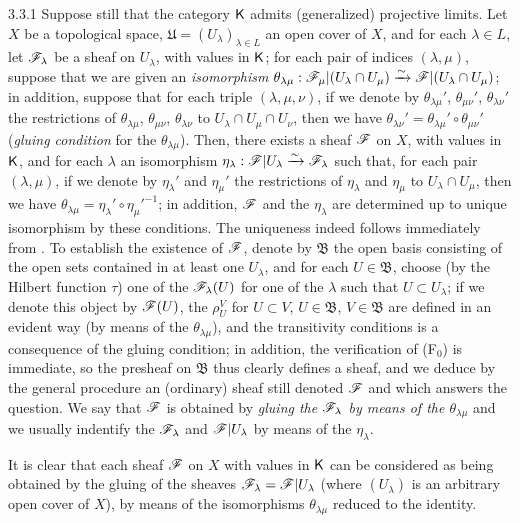 \begin{env}{3.3.1}
\label{env-0.3.3.1}
Suppose still that the category $\mathsf{K}$ admits (generalized) projective limits. Let $X$ be
a topological space, $\mathfrak{U}=(U_\lambda)_{\lambda\in L}$ an open cover of $X$, and for
each $\lambda\in L$, let $\mathscr{F}_\lambda$ be a sheaf on $U_\lambda$, with values in $\mathsf{K}$; for
each pair of indices $(\lambda,\mu)$, suppose that we are given an \emph{isomorphism}
$\theta_{\lambda\mu}:\mathscr{F}_\mu|(U_\lambda\cap U_\mu)\xrightarrow{\sim}\mathscr{F}|(U_\lambda\cap U_\mu)$; in
addition, suppose that for each triple $(\lambda,\mu,\nu)$, if we denote by
$\theta_{\lambda\mu}'$, $\theta_{\mu\nu}'$, $\theta_{\lambda\nu}'$ the restrictions of
$\theta_{\lambda\mu}$, $\theta_{\mu\nu}$, $\theta_{\lambda\nu}$ to
$U_\lambda\cap U_\mu\cap U_\nu$, then we have
$\theta_{\lambda\nu}'=\theta_{\lambda\mu}'\circ\theta_{\mu\nu}'$ (\emph{gluing condition} for
the $\theta_{\lambda\mu}$). Then, there exists a sheaf $\mathscr{F}$ on $X$, with values in $\mathsf{K}$,
and for each $\lambda$ an isomorphism
$\eta_\lambda:\mathscr{F}|U_\lambda\xrightarrow{\sim}\mathscr{F}_\lambda$ such that, for each pair
$(\lambda,\mu)$, if we denote by $\eta_\lambda'$ and $\eta_\mu'$ the restrictions of
$\eta_\lambda$ and $\eta_\mu$ to $U_\lambda\cap U_\mu$, then we have
$\theta_{\lambda\mu}=\eta_\lambda'\circ{\eta_\mu'}^{-1}$; in addition, $\mathscr{F}$ and the
$\eta_\lambda$ are determined up to unique isomorphism by these conditions. The uniqueness
indeed follows immediately from . To establish the existence of $\mathscr{F}$,
denote by $\mathfrak{B}$ the open basis consisting of the open sets contained in at least one
$U_\lambda$, and for each $U\in\mathfrak{B}$, choose (by the Hilbert function $\tau$) one of
the $\mathscr{F}_\lambda(U)$ for one of the $\lambda$ such that $U\subset U_\lambda$; if we denote
this object by $\mathscr{F}(U)$, the $\rho_U^V$ for $U\subset V$, $U\in\mathfrak{B}$,
$V\in\mathfrak{B}$ are defined in an evident way (by means of the $\theta_{\lambda\mu}$), and
the transitivity conditions is a consequence of the gluing condition; in addition, the
verification of (F$_0$) is immediate, so the presheaf on $\mathfrak{B}$ thus clearly defines
a sheaf, and we deduce by the general procedure  an (ordinary) sheaf still
denoted $\mathscr{F}$ and which answers the question. We say that $\mathscr{F}$ is obtained by
\emph{gluing the $\mathscr{F}_\lambda$ by means of the $\theta_{\lambda\mu}$} and we usually
indentify the $\mathscr{F}_\lambda$ and $\mathscr{F}|U_\lambda$ by means of the $\eta_\lambda$.

It is clear that each sheaf $\mathscr{F}$ on $X$ with values in $\mathsf{K}$ can be considered as being
obtained by the gluing of the sheaves $\mathscr{F}_\lambda=\mathscr{F}|U_\lambda$ (where $(U_\lambda)$
is an arbitrary open cover of $X$), by means of the isomorphisms $\theta_{\lambda\mu}$
reduced to the identity.
\end{env}

